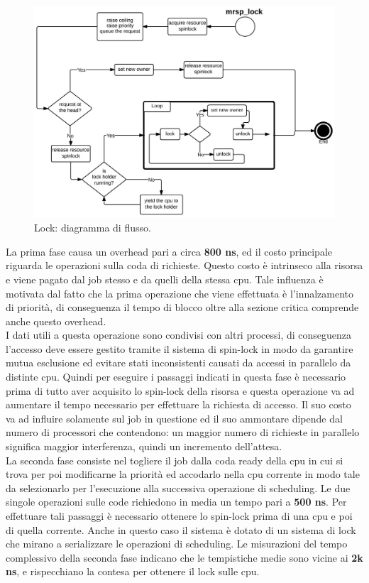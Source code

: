 \begin{figure}
\includegraphics[width=\linewidth]{images/mrsp_lock.jpeg}
\caption{Lock: diagramma di flusso.}
\label{fig:mrsplock}
\end{figure}

\noindent La prima fase causa un overhead pari a circa \textbf{800 ns}, ed il costo principale riguarda le operazioni sulla coda di richieste. Questo costo è intrinseco alla risorsa e viene pagato dal job stesso e da quelli della stessa cpu. Tale influenza è motivata dal fatto che la prima operazione che viene effettuata è l'innalzamento di priorità, di conseguenza il tempo di blocco oltre alla sezione critica comprende anche questo overhead.\\

\noindent I dati utili a questa operazione sono condivisi con altri processi, di conseguenza l'accesso deve essere gestito tramite il sistema di spin-lock in modo da garantire mutua esclusione ed evitare stati inconsistenti causati da accessi in parallelo da distinte cpu. Quindi per eseguire i passaggi indicati in questa fase è necessario prima di tutto aver acquisito lo spin-lock della risorsa e questa operazione va ad aumentare il tempo necessario per effettuare la richiesta di accesso. Il suo costo va ad influire solamente sul job in questione ed il suo ammontare dipende dal numero di processori che contendono: un maggior numero di richieste in parallelo significa maggior interferenza, quindi un incremento dell'attesa.\\

\noindent La seconda fase consiste nel togliere il job dalla coda ready della cpu in cui si trova per poi modificarne la priorità ed accodarlo nella cpu corrente in modo tale da selezionarlo per l'esecuzione alla successiva operazione di scheduling. Le due singole operazioni sulle code richiedono in media un tempo pari a \textbf{500 ns}. Per effettuare tali passaggi è necessario ottenere lo spin-lock prima di una cpu e poi di quella corrente. Anche in questo caso il sistema è dotato di un sistema di lock che mirano a serializzare le operazioni di scheduling. Le misurazioni del tempo complessivo della seconda fase indicano che le tempistiche medie sono vicine ai \textbf{2k ns}, e rispecchiano la contesa per ottenere il lock sulle cpu.\\

